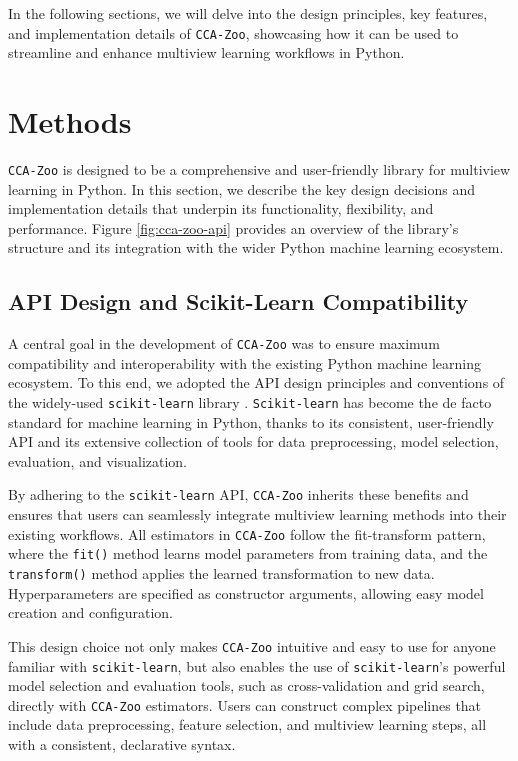 In the following sections, we will delve into the design principles, key features, and implementation details of \texttt{CCA-Zoo}, showcasing how it can be used to streamline and enhance multiview learning workflows in Python.

\section{Methods}

\texttt{CCA-Zoo} is designed to be a comprehensive and user-friendly library for multiview learning in Python. In this section, we describe the key design decisions and implementation details that underpin its functionality, flexibility, and performance. Figure \ref{fig:cca-zoo-api} provides an overview of the library's structure and its integration with the wider Python machine learning ecosystem.

\subsection{API Design and Scikit-Learn Compatibility}

A central goal in the development of \texttt{CCA-Zoo} was to ensure maximum compatibility and interoperability with the existing Python machine learning ecosystem. To this end, we adopted the API design principles and conventions of the widely-used \texttt{scikit-learn} library \citep{pedregosa2011scikit}. \texttt{Scikit-learn} has become the de facto standard for machine learning in Python, thanks to its consistent, user-friendly API and its extensive collection of tools for data preprocessing, model selection, evaluation, and visualization.

By adhering to the \texttt{scikit-learn} API, \texttt{CCA-Zoo} inherits these benefits and ensures that users can seamlessly integrate multiview learning methods into their existing workflows. All estimators in \texttt{CCA-Zoo} follow the fit-transform pattern, where the \texttt{fit()} method learns model parameters from training data, and the \texttt{transform()} method applies the learned transformation to new data. Hyperparameters are specified as constructor arguments, allowing easy model creation and configuration.

This design choice not only makes \texttt{CCA-Zoo} intuitive and easy to use for anyone familiar with \texttt{scikit-learn}, but also enables the use of \texttt{scikit-learn}'s powerful model selection and evaluation tools, such as cross-validation and grid search, directly with \texttt{CCA-Zoo} estimators. Users can construct complex pipelines that include data preprocessing, feature selection, and multiview learning steps, all with a consistent, declarative syntax.

